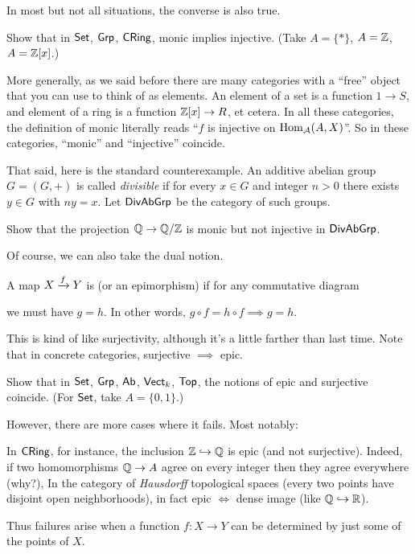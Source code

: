 In most but not all situations, the converse is also true.
\begin{exercise}
	Show that in $\mathsf{Set}$, $\mathsf{Grp}$, $\mathsf{CRing}$,
	monic implies injective. (Take $A = \{\ast\}$, $A = \mathbb Z$, $A = \mathbb Z[x]$.)
\end{exercise}
More generally, as we said before there are many categories
with a ``free'' object that you can use to think of as elements.
An element of a set is a function $1 \to S$,
and element of a ring is a function $\mathbb Z[x] \to R$, et cetera.
In all these categories,
the definition of monic literally reads
``$f$ is injective on $\operatorname{Hom}_\mathcal A(A, X)$''.
So in these categories, ``monic'' and ``injective'' coincide.

That said, here is the standard counterexample.
An additive abelian group $G = (G,+)$ is called \emph{divisible}
if for every $x \in G$ and integer $n > 0$ there exists $y \in G$ with $ny = x$.
Let $\mathsf{DivAbGrp}$ be the category of such groups.
\begin{exercise}
	Show that the projection $\mathbb Q \to \mathbb Q/\mathbb Z$ is monic but not injective in $\mathsf{DivAbGrp}$.
\end{exercise}

Of course, we can also take the dual notion.
\begin{definition}
	A map $X \xrightarrow{f} Y$ is 
	(or an epimorphism) if for any commutative diagram
	\begin{center}
	\end{center}
	we must have $g = h$.
	In other words, $g \circ f = h \circ f \implies g = h$.
\end{definition}

This is kind of like surjectivity, although it's a little farther than last time.
Note that in concrete categories, surjective $\implies$ epic.
\begin{exercise}
	Show that in $\mathsf{Set}$, $\mathsf{Grp}$, $\mathsf{Ab}$, $\mathsf{Vect}_k$, $\mathsf{Top}$,
	the notions of epic and surjective coincide.
	(For $\mathsf{Set}$, take $A = \{0, 1\}$.)
\end{exercise}
However, there are more cases where it fails.
Most notably:
\begin{example}
	\listhack
	\begin{enumerate}[(a)]
		\ii In $\mathsf{CRing}$, for instance, the inclusion $\mathbb Z \hookrightarrow \mathbb Q$ is epic
		(and not surjective).
		Indeed, if two homomorphisms $\mathbb Q \to A$ agree on
		every integer then they agree everywhere (why?),
		\ii In the category of \emph{Hausdorff} topological spaces
		(every two points have disjoint open neighborhoods),
		in fact epic $\iff$ dense image (like $\mathbb Q \hookrightarrow \mathbb R$).
	\end{enumerate}
	Thus failures arise when a function $f \colon X \to Y$ can be determined by just some of the points of $X$.
\end{example}


